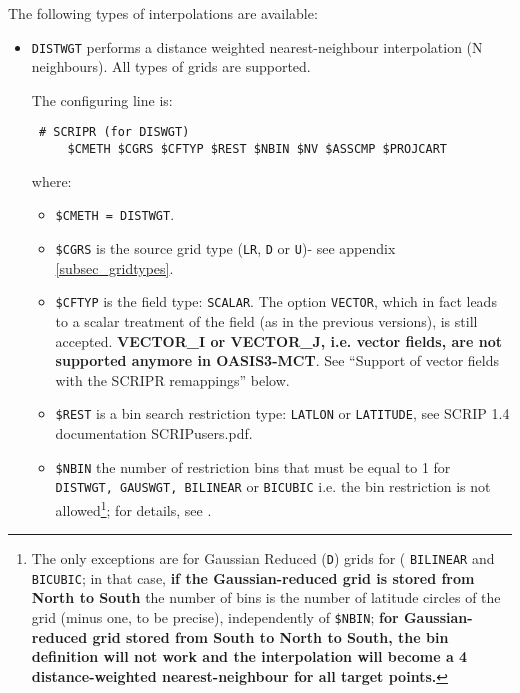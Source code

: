 \begin{itemize}
  The following types of interpolations are available:

  \begin{itemize}

  \item {\tt DISTWGT} performs a distance weighted nearest-neighbour
    interpolation (N neighbours). All types of grids are supported.

    The configuring line is:

  \begin{verbatim}
 # SCRIPR (for DISWGT) 
     $CMETH $CGRS $CFTYP $REST $NBIN $NV $ASSCMP $PROJCART
\end{verbatim} 
    where:
    \begin{itemize}
    \item {\tt \$CMETH = DISTWGT}.
    \item {\tt \$CGRS} is the source grid type ({\tt LR}, {\tt D} or
      {\tt U})- see appendix \ref{subsec_gridtypes}.

    \item {\tt \$CFTYP} is the field type: {\tt SCALAR}. The option
      {\tt VECTOR}, which in fact leads to a scalar treatment of the
      field (as in the previous versions), is still accepted. {\bf
        VECTOR\_I or VECTOR\_J, i.e. vector fields, are not supported
        anymore in OASIS3-MCT}. See ``Support of vector fields with
      the SCRIPR remappings'' below.

    \item {\tt \$REST} is a bin search restriction type: {\tt LATLON} or
      {\tt LATITUDE}, see SCRIP 1.4 documentation SCRIPusers.pdf.
      
    \item {\tt \$NBIN} the number of restriction bins that must be equal to 1 for {\tt DISTWGT, GAUSWGT, BILINEAR} or {\tt BICUBIC} i.e. the
      bin restriction is not allowed\footnote{The only exceptions are for Gaussian Reduced ({\tt D}) grids for ( {\tt BILINEAR} and {\tt BICUBIC}; in that case, {\bf if the Gaussian-reduced grid is stored from North to South} the number of bins is the number of latitude circles of the grid (minus one, to be precise), independently of {\tt \$NBIN}; {\bf for Gaussian-reduced grid stored from South to North to South, the bin definition will not work and the interpolation will become a 4 distance-weighted nearest-neighbour for all target points.}}; for details, see \newline \citep{piacentini08}.
      

\end{itemize}
\end{itemize}
\end{itemize}
